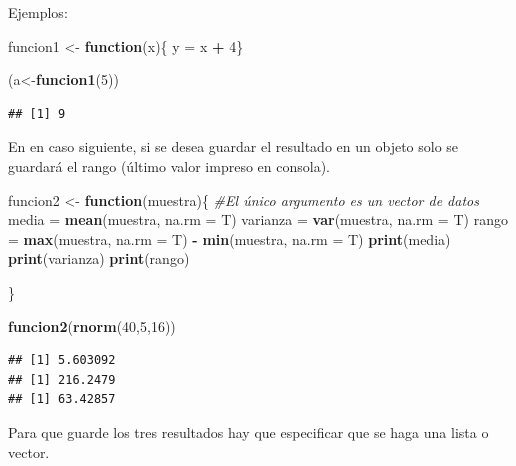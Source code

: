 \documentclass[]{book}
\newenvironment{Shaded}{\begin{snugshade}}{\end{snugshade}}
\newcommand{\KeywordTok}[1]{\textcolor[rgb]{0.13,0.29,0.53}{\textbf{#1}}}
\newcommand{\DataTypeTok}[1]{\textcolor[rgb]{0.13,0.29,0.53}{#1}}
\newcommand{\DecValTok}[1]{\textcolor[rgb]{0.00,0.00,0.81}{#1}}
\newcommand{\StringTok}[1]{\textcolor[rgb]{0.31,0.60,0.02}{#1}}
\newcommand{\CommentTok}[1]{\textcolor[rgb]{0.56,0.35,0.01}{\textit{#1}}}
\newcommand{\ControlFlowTok}[1]{\textcolor[rgb]{0.13,0.29,0.53}{\textbf{#1}}}
\newcommand{\OperatorTok}[1]{\textcolor[rgb]{0.81,0.36,0.00}{\textbf{#1}}}
\newcommand{\NormalTok}[1]{#1}
\begin{document}
Ejemplos:

\begin{Shaded}
\begin{Highlighting}[]
\NormalTok{funcion1 <-}\StringTok{ }\ControlFlowTok{function}\NormalTok{(x)\{ y =}\StringTok{ }\NormalTok{x }\OperatorTok{+}\StringTok{ }\DecValTok{4}\NormalTok{\}}

\NormalTok{(a<-}\KeywordTok{funcion1}\NormalTok{(}\DecValTok{5}\NormalTok{))}
\end{Highlighting}
\end{Shaded}

\begin{verbatim}
## [1] 9
\end{verbatim}

En en caso siguiente, si se desea guardar el resultado en un objeto solo
se guardará el rango (último valor impreso en consola).

\begin{Shaded}
\begin{Highlighting}[]
\NormalTok{funcion2 <-}\StringTok{ }\ControlFlowTok{function}\NormalTok{(muestra)\{     }\CommentTok{#El único argumento es un vector de datos}
\NormalTok{  media =}\StringTok{ }\KeywordTok{mean}\NormalTok{(muestra, }\DataTypeTok{na.rm =}\NormalTok{ T)}
\NormalTok{  varianza =}\StringTok{ }\KeywordTok{var}\NormalTok{(muestra, }\DataTypeTok{na.rm =}\NormalTok{ T)}
\NormalTok{  rango =}\StringTok{ }\KeywordTok{max}\NormalTok{(muestra, }\DataTypeTok{na.rm =}\NormalTok{ T) }\OperatorTok{-}\StringTok{ }\KeywordTok{min}\NormalTok{(muestra, }\DataTypeTok{na.rm =}\NormalTok{ T)}
  \KeywordTok{print}\NormalTok{(media)}
  \KeywordTok{print}\NormalTok{(varianza)}
  \KeywordTok{print}\NormalTok{(rango)}

\NormalTok{\}}

\KeywordTok{funcion2}\NormalTok{(}\KeywordTok{rnorm}\NormalTok{(}\DecValTok{40}\NormalTok{,}\DecValTok{5}\NormalTok{,}\DecValTok{16}\NormalTok{))}
\end{Highlighting}
\end{Shaded}

\begin{verbatim}
## [1] 5.603092
## [1] 216.2479
## [1] 63.42857
\end{verbatim}

Para que guarde los tres resultados hay que especificar que se haga una
lista o vector.
\end{document}
